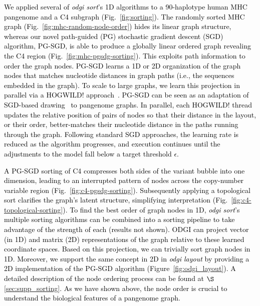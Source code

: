 \documentclass{bioinfo}
\newcommand{\REVIEWED}[1]{{\textcolor{Black}{#1}}}
\begin{document}
\REVIEWED{We applied several of \textit{odgi sort}'s 1D algorithms to a 90-haplotype human MHC pangenome and a C4 subgraph (Fig.~\ref{fig:sorting}).
The randomly sorted MHC graph (Fig.~\ref{fig:mhc-random-node-order}) hides its linear graph structure, whereas our novel path-guided (PG) stochastic gradient descent (SGD) algorithm, PG-SGD, is able to produce a globally linear ordered graph revealing the C4 region (Fig.~\ref{fig:mhc-pgsdg-sorting}).
This exploits path information to order the graph nodes.
PG-SGD learns a 1D or 2D organization of the graph nodes that matches nucleotide distances in graph paths (i.e., the sequences embedded in the graph).
To scale to large graphs, we learn this projection in parallel via a HOGWILD! approach~\citep{niu2011hogwild}.
PG-SGD can be seen as an adaptation of SGD-based drawing~\citep{zheng2018graph} to pangenome graphs.
In parallel, each HOGWILD! thread updates the relative position of pairs of nodes so that their distance in the layout, or their order, better-matches  their nucleotide distance in the paths running through the graph.
Following standard SGD approaches, the learning rate is reduced as the algorithm progresses, and execution continues until the adjustments to the model fall below a target threshold $\epsilon$.}

\REVIEWED{A PG-SGD sorting of C4 compresses both sides of the variant bubble into one dimension, leading to an interrupted pattern of nodes across the copy-number variable region (Fig.~\ref{fig:c4-pgsdg-sorting}).
Subsequently applying a topological sort clarifies the graph's latent structure, simplifying interpretation (Fig.~\ref{fig:c4-topological-sorting}). }
%
\REVIEWED{To find the best order of graph nodes in 1D, \textit{odgi sort}'s multiple sorting algorithms can be combined into a sorting pipeline to take advantage of the strength of each (results not shown).
ODGI can project vector (in 1D) and matrix (2D) representations of the graph relative to these learned coordinate spaces.
Based on this projection, we can trivially sort graph nodes in 1D.
Moreover, we support the same concept in 2D in \textit{odgi layout} by providing a 2D implementation of the PG-SGD algorithm (Figure~\ref{fig:odgi_layout}). A detailed description of the node ordering process can be found at $\S$\ref{sec:supp_sorting}. As we have shown above, the node order is crucial to understand the biological features of a pangenome graph.}
\end{document}
